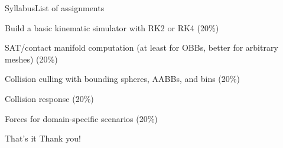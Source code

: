 \documentclass{beamer}
\begin{document}
\begin{slide}{Syllabus}{List of assignments}{
\item Build a basic kinematic simulator with RK2 or RK4 (20\%)
\item SAT/contact manifold computation (at least for OBBs, better for arbitrary meshes) (20\%)
\item Collision culling with bounding spheres, AABBs, and bins (20\%)
\item Collision response (20\%)
\item Forces for domain-specific scenarios (20\%)
}\end{slide}

\begin{frame}{That's it}
\center
\fontsize{18pt}{7.2}\selectfont
Thank you!
\end{frame}
\end{document}
